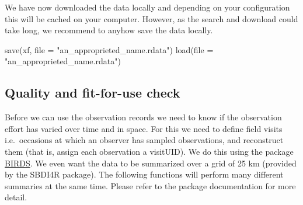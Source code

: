 \documentclass[
  10pt,
]{article}
\newenvironment{Shaded}{\begin{snugshade}}{\end{snugshade}}
\newcommand{\AttributeTok}[1]{\textcolor[rgb]{0.77,0.63,0.00}{#1}}
\newcommand{\CommentTok}[1]{\textcolor[rgb]{0.56,0.35,0.01}{\textit{#1}}}
\newcommand{\FunctionTok}[1]{\textcolor[rgb]{0.00,0.00,0.00}{#1}}
\newcommand{\NormalTok}[1]{#1}
\newcommand{\OtherTok}[1]{\textcolor[rgb]{0.56,0.35,0.01}{#1}}
\newcommand{\SpecialCharTok}[1]{\textcolor[rgb]{0.00,0.00,0.00}{#1}}
\newcommand{\StringTok}[1]{\textcolor[rgb]{0.31,0.60,0.02}{#1}}
\begin{document}
We have now downloaded the data locally and depending on your configuration this
will be cached on your computer. However, as the search and download could take
long, we recommend to anyhow save the data locally.

\begin{Shaded}
\begin{Highlighting}[]
\FunctionTok{save}\NormalTok{(xf, }\AttributeTok{file =} \StringTok{"an\_approprieted\_name.rdata"}\NormalTok{)}
\FunctionTok{load}\NormalTok{(}\AttributeTok{file =} \StringTok{"an\_approprieted\_name.rdata"}\NormalTok{)}
\end{Highlighting}
\end{Shaded}

\hypertarget{quality-and-fit-for-use-check}{%
\subsection{Quality and fit-for-use check}\label{quality-and-fit-for-use-check}}

Before we can use the observation records we need to know if the observation
effort has varied over time and in space. For this we need to define field visits
i.e.~occasions at which an observer has sampled observations, and reconstruct them
(that is, assign each observation a visitUID). We do this using the package
\href{https://greensway.github.io/BIRDS/}{BIRDS}. We even want the data to be summarized
over a grid of 25 km (provided by the SBDI4R package). The following functions
will perform many different summaries at the same time. Please refer to the package
documentation for more detail.

\begin{Shaded}
\end{Shaded}
\end{document}
